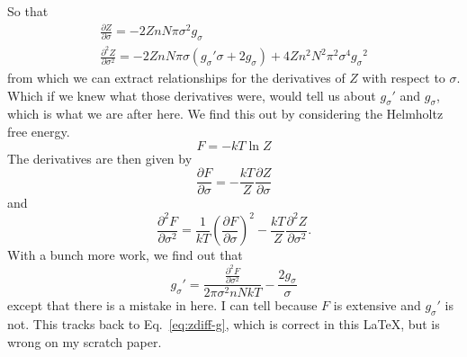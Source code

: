 \documentclass[letterpaper,twocolumn,amsmath,amssymb,pre,aps,10pt]{revtex4-1}
\begin{document}
So that
\begin{multline}
  \frac{\partial Z}{\partial \sigma} =
  -2ZnN\pi\sigma^2g_\sigma\\
  \frac{\partial^2 Z}{\partial \sigma^2} =
  -2ZnN\pi\sigma\left(g_\sigma'\sigma + 2g_\sigma \right)
  +4Zn^2N^2\pi^2\sigma^4{g_\sigma}^2
\end{multline}
from which we can extract relationships for the derivatives of $Z$
with respect to $\sigma$.  Which if we knew what those derivatives
were, would tell us about $g_\sigma'$ and $g_\sigma$, which is what we
are after here.  We find this out by considering the Helmholtz free
energy.
\begin{equation}
  F = -kT \ln Z
\end{equation}
The derivatives are then given by
\begin{equation}
  \frac{\partial F}{\partial \sigma} = -\frac{kT}{Z} \frac{\partial
    Z}{\partial \sigma}
\end{equation}
and
\begin{equation}
  \frac{\partial^2 F}{\partial \sigma^2} =
  \frac{1}{kT}\left(\frac{\partial F}{\partial \sigma}\right)^2
  -\frac{kT}{Z} \frac{\partial^2
    Z}{\partial \sigma^2}.
\end{equation}
With a bunch more work, we find out that
\begin{equation}
  g_\sigma' = \frac{\frac{\partial^2 F}{\partial
      \sigma^2}}{2\pi\sigma^2nNkT}
  - \frac{2g_\sigma}{\sigma}
\end{equation}
except that there is a mistake in here.  I can tell because $F$ is
extensive and $g_\sigma'$ is not.  This tracks back to
Eq.~\ref{eq:zdiff-g}, which is correct in this \LaTeX, but is wrong on
my scratch paper.
\end{document}
